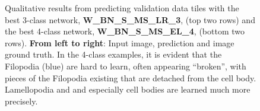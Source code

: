 \begin {figure}[!htb]
		\caption[Qualitative prediction results.]{Qualitative results from predicting validation data tiles with the best 3-class network, \textbf{W\_BN\_S\_MS\_LR\_3}, (top two rows) and the best 4-class network, \textbf{W\_BN\_S\_MS\_EL\_4}, (bottom two rows). \textbf{From left to right}: Input image, prediction and image ground truth. In the 4-class examples, it is evident that the Filopodia (blue) are hard to learn, often appearing ``broken'', with pieces of the Filopodia existing that are detached from the cell body. Lamellopodia and and especially cell bodies are learned much more precisely.}
		\label{fig:qualitative}
\end {figure}